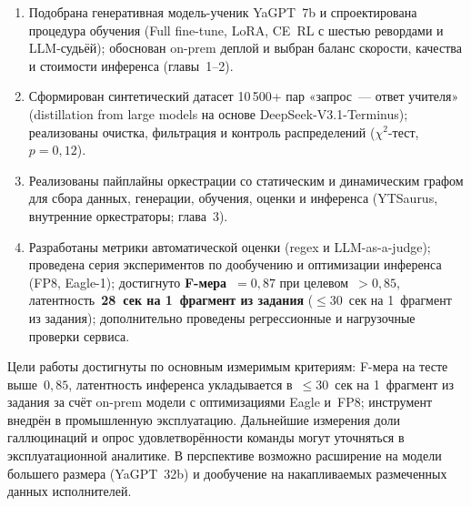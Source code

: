 \documentclass[times]{itmo-student-thesis}
\begin{document}
\begin{enumerate}
    \item Подобрана генеративная модель-ученик YaGPT~7b и спроектирована процедура
          обучения (Full fine-tune, LoRA, CE~RL с шестью ревордами и LLM-судьёй);
          обоснован on-prem деплой и выбран баланс скорости, качества и стоимости
          инференса (главы~1--2).
    \item Сформирован синтетический датасет 10\,500+ пар «запрос~--- ответ учителя»
          (distillation from large models на основе DeepSeek-V3.1-Terminus);
          реализованы очистка, фильтрация и контроль распределений
          ($\chi^2$-тест, $p = 0{,}12$).
    \item Реализованы пайплайны оркестрации со статическим и динамическим графом
          для сбора данных, генерации, обучения, оценки и инференса (YTSaurus,
          внутренние оркестраторы; глава~3).
    \item Разработаны метрики автоматической оценки (regex и LLM-as-a-judge);
          проведена серия экспериментов по дообучению и оптимизации инференса
          (FP8, Eagle-1); достигнуто \textbf{F-мера~$= 0{,}87$} при целевом~${>}0{,}85$,
          латентность~\textbf{28~сек на 1~фрагмент из задания}
          ($\le 30$~сек на 1~фрагмент из задания); дополнительно проведены
          регрессионные и нагрузочные проверки сервиса.
\end{enumerate}

Цели работы достигнуты по основным измеримым критериям: F-мера на тесте
выше~$0{,}85$, латентность инференса укладывается в~$\le 30$~сек
на 1~фрагмент из задания за счёт
on-prem модели с оптимизациями Eagle и~FP8; инструмент внедрён
в промышленную эксплуатацию. Дальнейшие измерения доли галлюцинаций
и опрос удовлетворённости команды могут уточняться в эксплуатационной аналитике.
В перспективе возможно расширение на модели большего размера (YaGPT~32b)
и дообучение на накапливаемых размеченных данных исполнителей.

\printmainbibliography

\appendix

\begingroup
\lstset{basicstyle=\normalsize\ttfamily, captionpos=b}
\end{document}

